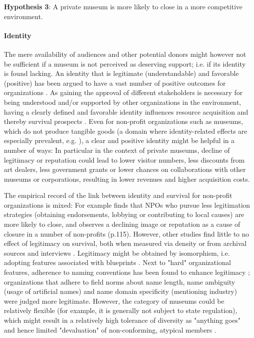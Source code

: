 \documentclass[12pt]{article}
\begin{document}
\textbf{Hypothesis 3}: A private museum is more likely to close in a more competitive environment.
\paragraph*{Identity}

The mere availability of audiences and other potential donors might however not be sufficient if a museum is not perceived as deserving support; i.e. if its identity is found lacking. 
An identity that is legitimate (understandable) and favorable (positive) has been argued to have a vast number of positive outcomes for organizations \parencite{Lange_Lee_Dai_2010_reputation}.
As gaining the approval of different stakeholders is necessary for being understood and/or supported by other organizations in the environment, having a clearly defined and favorable identity influences resource acquisition and thereby survival prospects \parencite{Rao_1994_reputation}.
Even for non-profit organizations such as museums, which do not produce tangible goods (a domain where identity-related effects are especially prevalent, e.g. \cite{Hsu_2015_granted,Bogaert_etal_2014_ecological}), a clear and positive identity might be helpful in a number of ways:
In particular in the context of private museums, decline of legitimacy or reputation could lead to lower visitor numbers, less discounts from art dealers, less government grants or lower chances on collaborations with other museums or corporations, resulting in lower revenues and higher acquisition costs.


The empirical record of the link between identity and survival for non-profit organizations is mixed: 
For example \textcite{Bielefeld_1994_survival} finds that NPOs who pursue less legitimation strategies (obtaining endorsements, lobbying or contributing to local causes) are more likely to close, and \textcite{HernandezOrtiz_2022_discontinuity} observes a declining image or reputation as a cause of closure in a number of non-profits (p.115).
However, other studies find little to no effect of legitimacy on survival, both when measured via density \parencite{Bogaert_etal_2014_ecological} or from archival sources and interviews \parencite{Fernandez_2007_dissolution}.
Legitimacy might be obtained by isomorphism, i.e. adopting features associated with blueprints \parencite{diMaggio_1983_iron}.
Next to "hard" organizational features, adherence to naming conventions has been found to enhance legitimacy \parencite{Glynn_Abzug_2002_names}; organizations that adhere to field norms about name length, name ambiguity (usage of artificial names) and name domain specificity (mentioning industry) were judged more legitimate. 
However, the category of museums could be relatively flexible (for example, it is generally not subject to state regulation), which might result in a relatively high tolerance of diversity as "anything goes" and hence limited "devaluation" of non-conforming, atypical members \parencite{Bogaert_etal_2014_ecological}.
\end{document}
